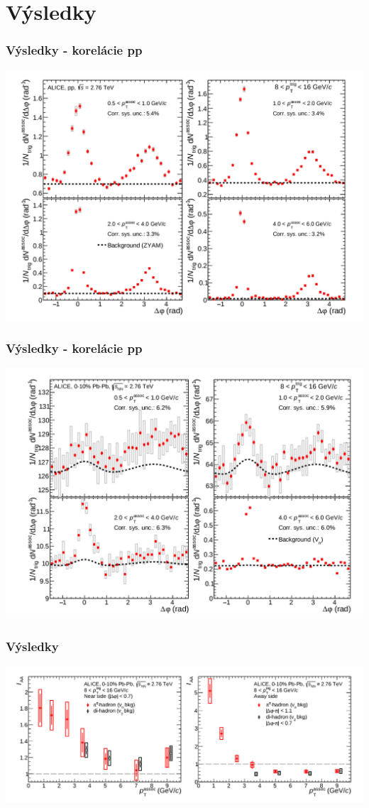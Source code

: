 \documentclass{beamer}
\begin{document}
	\section{Výsledky}
	\begin{frame}
		\frametitle{Výsledky - korelácie pp}
		\centering \includegraphics[scale=0.3]{./Obrazky/korelacie.png}
	\end{frame}
	
	\begin{frame}
		\frametitle{Výsledky - korelácie pp}
		\centering \includegraphics[scale=0.3]{./Obrazky/pozadie.png}
	\end{frame}
	
	\begin{frame}
		\frametitle{Výsledky}
		\centering \includegraphics[scale=0.3]{./Obrazky/Iaa.png}
	\end{frame}
	
\end{document}
